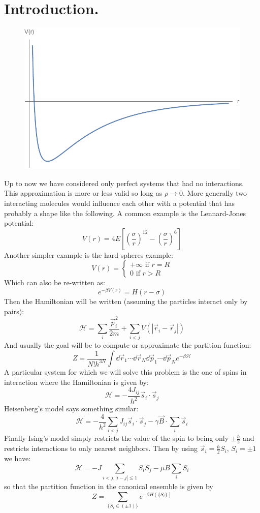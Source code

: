 \documentclass[10pt,a4paper]{book}
\begin{document}
\section{Introduction.}
\begin{figure}
\includegraphics[width = 0.3 \textwidth]{graphs/ExamplePotential}
\end{figure}
Up to now we have considered only perfect systems that had no interactions. This approximation is more or less valid so long as $\rho \to 0$. More generally two interacting molecules would influence each other with a potential that has probably a shape like the following. A common example is the Lennard-Jones potential:
\[
V(r) = 4 E \left[ \left(\frac{\sigma}{r}\right)^{12} - \left(\frac{\sigma}{r}\right)^6 \right]
\]
Another simpler example is the hard spheres example:
\[
V(r) = \begin{cases} +\infty \text{ if } r = R\\0 \text{ if } r > R
\end{cases}
\]
Which can also be re-written as:
\[
e^{-\beta V(r)} = H(r - \sigma)
\]
Then the Hamiltonian will be written (assuming the particles interact only by pairs):
\[
\mathcal{H} = \sum_i  \frac{\vec{p}_i^2}{2m} + \sum_{i < j} V(|\vec{r}_i - \vec{r}_j|)
\]
And usually the goal will be to compute or approximate the partition function:
\[
Z = \frac{1}{N! h^{3N}}\int \dd \vec{r}_1 \cdots \dd \vec{r}_N \dd\vec{p}_1 \cdots \dd \vec{p}_N e^{-\beta\mathcal{H}}
\]
A particular system for which we will solve this problem is the one of spins in interaction where the Hamiltonian is given by:
\[
\mathcal{H} = - \frac{4 J_{ij}}{h^2} \vec{s}_i \cdot \vec{s}_j
\]
Heisenberg's model says something similar:
\[
\mathcal{H} = - \frac{4}{h^2}\sum_{i<j}J_{ij} \vec{s}_i \cdot \vec{s}_j - \gamma \vec{B} \cdot \sum_i \vec{s}_i
\]
Finally Ising's model simply restricts the value of the spin to being only $\pm\frac{\hbar}{2}$ and restricts interactions to only nearest neighbors. Then by using $\vec{s}_i=\frac{\hbar}{2}S_i$, $S_i=\pm 1$ we have:
\[
\mathcal{H} = - J \sum_{i < j, |i - j| \leq 1} S_i S_j - \mu B \sum_i S_i 
\]
so that the partition function in the canonical ensemble is given by
$$Z=\sum_{\{S_i\in(\pm 1)\}}e^{-\beta H(\{S_i\})}$$
\end{document}
